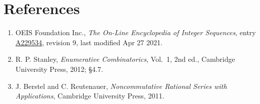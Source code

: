 \documentclass[11pt]{article}
\theoremstyle{definition}
\begin{document}
\section{References}

\begin{enumerate}

\item OEIS Foundation Inc., \emph{The On-Line Encyclopedia of Integer Sequences}, entry \href{https://oeis.org/A229534}{A229534}, revision 9, last modified Apr 27 2021.

\item R. P. Stanley, \emph{Enumerative Combinatorics}, Vol.~1, 2nd ed., Cambridge University Press, 2012; \S4.7.

\item J. Berstel and C. Reutenauer, \emph{Noncommutative Rational Series with Applications}, Cambridge University Press, 2011.

\end{enumerate}
\end{document}
